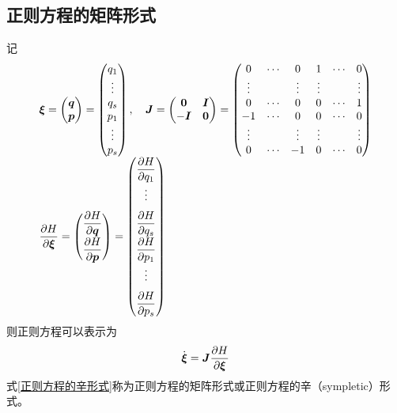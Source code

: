 \subsection{正则方程的矩阵形式}

记
\begin{equation*}
	\begin{array}{l}
	\displaystyle \boldsymbol{\xi} = \begin{pmatrix} \boldsymbol{q} \\ \boldsymbol{p} \end{pmatrix} = \begin{pmatrix} q_1 \\ \vdots \\ q_s \\ p_1 \\ \vdots \\ p_s \end{pmatrix},\quad \boldsymbol{J} = \begin{pmatrix} \boldsymbol{0} & \boldsymbol{I} \\ -\boldsymbol{I} & \boldsymbol{0} \end{pmatrix} = \begin{pmatrix} 0 & \cdots & 0 & 1 & \cdots & 0 \\ \vdots & & \vdots & \vdots & & \vdots \\ 0 & \cdots & 0 & 0 & \cdots & 1 \\ -1 & \cdots & 0 & 0 & \cdots & 0 \\ \vdots & & \vdots & \vdots & & \vdots \\ 0 & \cdots & -1 & 0 & \cdots & 0 \end{pmatrix} \\
	\displaystyle \frac{\partial H}{\partial \boldsymbol{\xi}} = \begin{pmatrix} \dfrac{\partial H}{\partial \boldsymbol{q}} \\[1.5ex] \dfrac{\partial H}{\partial \boldsymbol{p}} \end{pmatrix} = \begin{pmatrix} \dfrac{\partial H}{\partial q_1} \\[1.5ex] \vdots \\[1.5ex] \dfrac{\partial H}{\partial q_s} \\[1.5ex] \dfrac{\partial H}{\partial p_1} \\[1.5ex] \vdots \\[1.5ex] \dfrac{\partial H}{\partial p_s} \end{pmatrix}
	\end{array}
\end{equation*}
则正则方程可以表示为
\begin{equation}
	\dot{\boldsymbol{\xi}} = \boldsymbol{J} \frac{\partial H}{\partial \boldsymbol{\xi}}
	\label{正则方程的辛形式}
\end{equation}
式\eqref{正则方程的辛形式}称为{\heiti 正则方程的矩阵形式}或{\heiti 正则方程的辛（sympletic）形式}。

